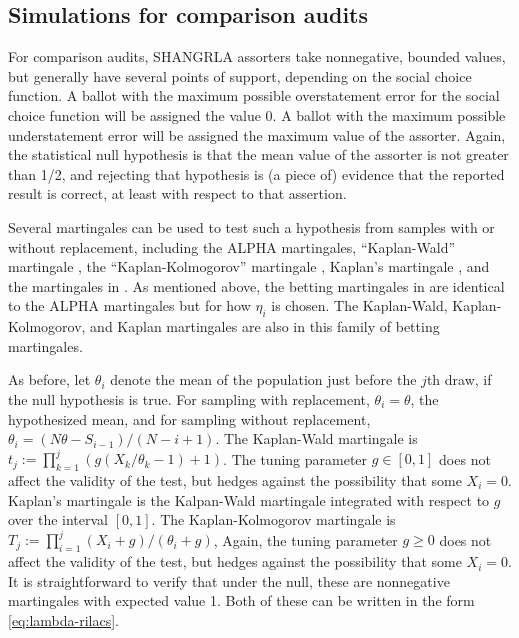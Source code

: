 \documentclass[12pt,runningheads]{llncs}
\begin{document}
{\subsection{Simulations for comparison audits} \label{sec:comparison-audit-sims}

For comparison audits, SHANGRLA assorters take nonnegative, bounded values, but generally have  several points of 
support, depending on the social choice function.
A ballot with the maximum possible overstatement error for the social choice function will be assigned the value 0.
A ballot with the maximum possible understatement error will be assigned the maximum value of the assorter.
Again, the statistical null hypothesis is that the mean value of the assorter is not greater than 1/2, and rejecting that
hypothesis is (a piece of) evidence that the reported result is correct, at least with respect to that assertion.

Several martingales can be used to test such a hypothesis from samples with or without replacement, including the ALPHA
martingales,
``Kaplan-Wald'' martingale \cite{stark09b}, the ``Kaplan-Kolmogorov'' martingale \cite{starkEvans19,stark20}, Kaplan's martingale 
\cite{starkEvans19,stark20},
and the martingales in \cite{waudby-smithRamdas21,waudby-smithEtal21}.
As mentioned above, the betting martingales in \cite{waudby-smithRamdas21,waudby-smithEtal21} are
identical to the ALPHA martingales but for how $\eta_i$ is chosen.
The Kaplan-Wald, Kaplan-Kolmogorov, and Kaplan martingales are also in this family of betting martingales.

As before, let $\theta_i$ denote the mean of the population just before the $j$th draw, if the null hypothesis is true.
For sampling with replacement, $\theta_i = \theta$, the hypothesized mean, and for sampling without replacement,
$\theta_i = (N\theta-S_{i-1})/(N-i+1)$.
The Kaplan-Wald martingale is $t_j := \prod_{k=1}^j \left (g(X_k/\theta_k - 1)+1 \right )$.
The tuning parameter $g \in [0, 1]$ does not affect the validity of the test, but hedges against the possibility that some $X_i = 0$.
Kaplan's martingale is the Kalpan-Wald martingale integrated with respect to $g$ over the interval $[0, 1]$.
The Kaplan-Kolmogorov martingale is $T_j := \prod_{i=1}^j (X_i+g)/(\theta_i+g)$, 
Again, the tuning parameter $g \ge 0$ does not affect the validity of the test, but hedges against the possibility that some $X_i = 0$.
It is straightforward to verify that under the null, these are nonnegative martingales with expected value 1.
Both of these can be written in the form \ref{eq:lambda-rilacs}.

}
\end{document}
